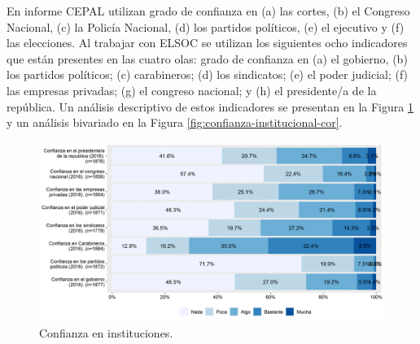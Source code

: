 \documentclass[
  12pt,
]{book}
\begin{document}
En informe CEPAL utilizan grado de confianza en (a) las cortes, (b) el Congreso Nacional, (c) la Policía Nacional, (d) los partidos políticos, (e) el ejecutivo y (f) las elecciones. Al trabajar con ELSOC se utilizan los siguientes ocho indicadores que están presentes en las cuatro olas: grado de confianza en (a) el gobierno, (b) los partidos políticos; (c) carabineros; (d) los sindicatos; (e) el poder judicial; (f) las empresas privadas; (g) el congreso nacional; y (h) el presidente/a de la república. Un análisis descriptivo de estos indicadores se presentan en la Figura \ref{fig:confianza-institucional} y un análisis bivariado en la Figura \ref{fig:confianza-institucional-cor}.

\begin{figure}[H]

{\centering \includegraphics[width=1\linewidth,height=1\textheight]{output/graphs/confianza-institucional} 

}

\caption{Confianza en instituciones.}\label{fig:confianza-institucional}
\end{figure}
\end{document}
